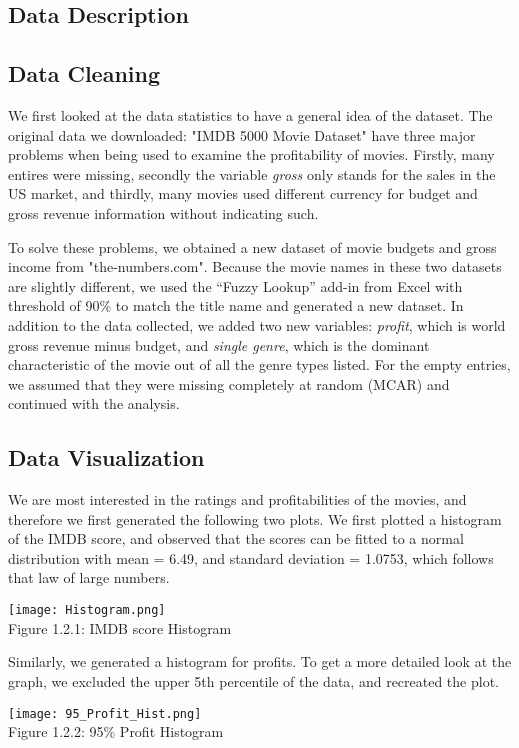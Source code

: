 \documentclass[12pt]{article}
\begin{document}
\begin{multicols}{2}
\section{Data Description}
\par
\bigskip
\subsection{Data Cleaning}
\bigskip
We first looked at the data statistics to have a general idea of the dataset. The original data we downloaded: "IMDB 5000 Movie Dataset" have three major problems when being used to examine the profitability of movies. Firstly, many entires were missing, secondly the variable \textit{gross} only stands for the sales in the US market, and thirdly, many movies used different currency for budget and gross revenue information without indicating such. \par
To solve these problems, we obtained a new dataset of movie budgets and gross income from "the-numbers.com". Because the movie names in these two datasets are slightly different,  we used the “Fuzzy Lookup” add-in from Excel with threshold of 90\% to match the title name and generated a new dataset. In addition to the data collected, we added two new variables: \textit{profit}, which is world gross revenue minus budget, and \textit{single genre}, which is the dominant characteristic of the movie out of all the genre types listed. For the empty entries, we assumed that they were missing completely at random (MCAR) and continued with the analysis. 
\par
\bigskip
\subsection{Data Visualization}
\bigskip
We are most interested in the ratings and profitabilities of the movies, and therefore we first generated the following two plots. We first plotted a histogram of the IMDB score, and observed that the scores can be fitted to a normal distribution with mean = 6.49, and standard deviation = 1.0753, which follows that law of large numbers. 
\begin{center}
\texttt{[image: Histogram.png]}\\
Figure 1.2.1: IMDB score Histogram 
\end{center}

Similarly, we generated a histogram for profits. To get a more detailed look at the graph, we excluded the upper 5th percentile of the data, and recreated the plot. \par
\begin{center}
\texttt{[image: 95\_Profit\_Hist.png]}\\
Figure 1.2.2: 95\% Profit Histogram
\end{center}



\end{multicols}
\end{document}
